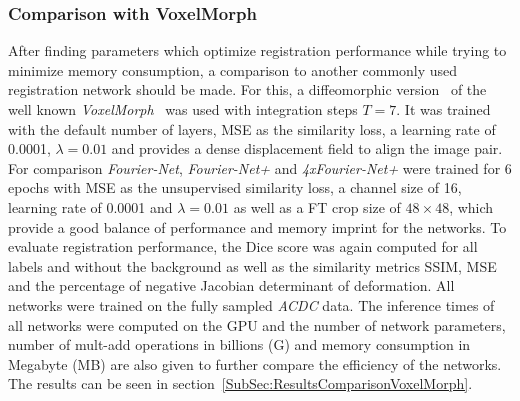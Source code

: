 \documentclass[english,version-2022-01]{uzl-thesis} %
\begin{document}
\subsubsection{Comparison with VoxelMorph} \label{SubSubSec:ComparisonVoxelMorph}
After finding parameters which optimize registration performance while trying to minimize memory consumption, a comparison to another commonly used registration network should be made. For this, a diffeomorphic version~\cite{VoxelMorphDiff} of the well known \emph{VoxelMorph}~\cite{Voxelmorph} was used with integration steps $T=7$. It was trained with the default number of layers, MSE as the similarity loss, a learning rate of 0.0001, $\lambda=0.01$ and provides a dense displacement field to align the image pair. For comparison \emph{Fourier-Net}, \emph{Fourier-Net+} and \emph{4xFourier-Net+} were trained for 6 epochs with MSE as the unsupervised similarity loss, a channel size of 16, learning rate of 0.0001 and $\lambda=0.01$ as well as a FT crop size of $48 \times 48$, which provide a good balance of performance and memory imprint for the networks. To evaluate registration performance, the Dice score was again computed for all labels and without the background as well as the similarity metrics SSIM, MSE and the percentage of negative Jacobian determinant of deformation. All networks were trained on the fully sampled \emph{ACDC} data. The inference times of all networks were computed on the GPU and the number of network parameters, number of mult-add operations in billions (G) and memory consumption in Megabyte (MB) are also given to further compare the efficiency of the networks. The results can be seen in section~\ref{SubSec:ResultsComparisonVoxelMorph}.
\end{document}
